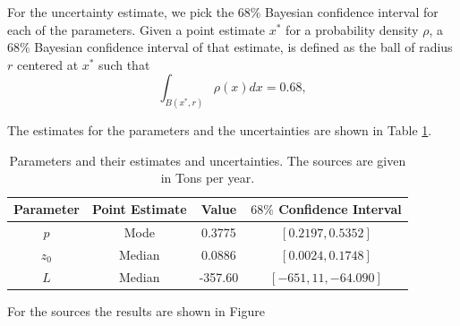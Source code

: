 \documentclass[12pt]{book}
\begin{document}
For the uncertainty estimate, we pick the $68\%$ Bayesian confidence interval
for each of the parameters. Given a point estimate $x^{*}$ 
for a probability density $\rho$, a $68\%$ Bayesian confidence interval of that estimate, 
is defined as the ball of radius $r$ centered at $x^{*}$ such that
\begin{equation*}
\int_{B(x^{*},r)}\rho(x)dx=0.68,
\end{equation*} 

The estimates for the parameters and the uncertainties are shown in Table \ref{tabFinalEstimates}.

\begin{table}[H]
\centering
\begin{tabular}{|c|c|c|c|}
\hline 
Parameter & Point Estimate & Value & $68\%$ Confidence Interval\tabularnewline
\hline 
\hline 
$p$ & Mode & 0.3775 & $[0.2197,0.5352]$\tabularnewline
\hline 
$z_{0}$ & Median & 0.0886 & $[0.0024,0.1748]$\tabularnewline
\hline 
$L$ & Median & -357.60 & $[-651,11,-64.090]$\tabularnewline
\hline 
\end{tabular}
\caption{Parameters and their estimates and uncertainties. The sources are given in Tons per year.}
\label{tabFinalEstimates}
\end{table}


For the sources the results are shown in Figure 
\end{document}
